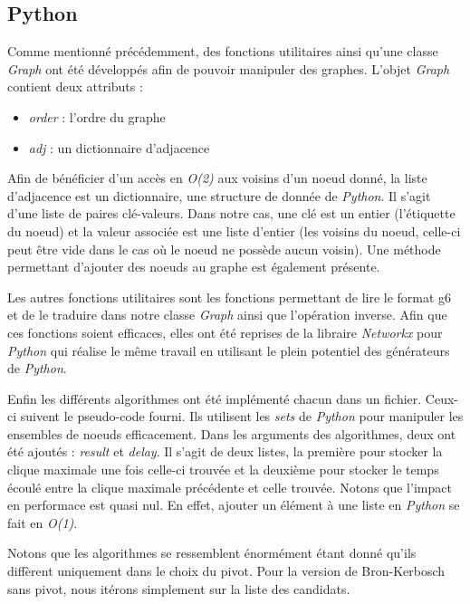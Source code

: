 \documentclass[12pt,a4paper]{article}
\begin{document}
\subsection{Python}%
\label{subsec:python}

Comme mentionné précédemment, des fonctions utilitaires ainsi qu'une classe \emph{Graph} ont été développés afin de pouvoir manipuler des graphes. L'objet \emph{Graph} contient deux attributs :
\begin{itemize}
  \item \emph{order} : l'ordre du graphe
  \item \emph{adj} : un dictionnaire d'adjacence
\end{itemize}

Afin de bénéficier d'un accès en \emph{O(2)} aux voisins d'un noeud donné, la liste d'adjacence est un dictionnaire, une structure de donnée de \emph{Python}. Il s'agit d'une liste de paires clé-valeurs. Dans notre cas, une clé est un entier (l'étiquette du noeud) et la valeur associée est une liste d'entier (les voisins du noeud, celle-ci peut être vide dans le cas où le noeud ne possède aucun voisin).
Une méthode permettant d'ajouter des noeuds au graphe est également présente.

Les autres fonctions utilitaires sont les fonctions permettant de lire le format g6 et de le traduire dans notre classe \emph{Graph} ainsi que l'opération inverse. Afin que ces fonctions soient efficaces, elles ont été reprises de la libraire \emph{Networkx} pour \emph{Python} qui réalise le même travail en utilisant le plein potentiel des générateurs de \emph{Python}.

Enfin les différents algorithmes ont été implémenté chacun dans un fichier. Ceux-ci suivent le pseudo-code fourni. Ils utilisent les \emph{sets} de \emph{Python} pour manipuler les ensembles de noeuds efficacement. Dans les arguments des algorithmes, deux ont été ajoutés : \emph{result} et \emph{delay}. Il s'agit de deux listes, la première pour stocker la clique maximale une fois celle-ci trouvée et la deuxième pour stocker le temps écoulé entre la clique maximale précédente et celle trouvée. Notons que l'impact en performace est quasi nul. En effet, ajouter un élément à une liste en \emph{Python} se fait en \emph{O(1)}.

Notons que les algorithmes se ressemblent énormément étant donné qu'ils diffèrent uniquement dans le choix du pivot. Pour la version de Bron-Kerbosch sans pivot, nous itérons simplement sur la liste des candidats.
\end{document}
